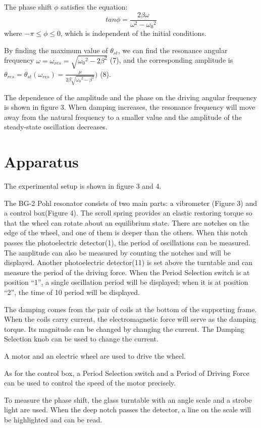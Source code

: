 \documentclass[12pt,a4paper]{article}
\begin{document}
The phase shift $\phi$ satisfies the equation:
\begin{equation}
    tan\phi=\frac{2\beta\omega}{\omega^2-{\omega_0}^2}
\end{equation}
where $-\pi\leq\phi\leq 0$, which is independent of the initial conditions. \par 
By finding the maximum value of $\theta_{st}$, we can find the resonance angular frequency $\omega=\omega_{res}=\sqrt{{\omega_0}^2-2\beta^2}$ (7), and the corresponding amplitude is $\theta_{res}=\theta_{st}(\omega_{res})=\frac{\mu}{2\beta\sqrt{{\omega_0}^2-\beta^2}})$ (8). \par 
The dependence of the amplitude and the phase on the driving angular frequency is shown in figure 3. When damping increases, the resonance frequency will move away from the natural frequency to a smaller value and the amplitude of the steady-state oscillation decreases.


\section{Apparatus}
The experimental setup is shown in figure 3 and 4.

The BG-2 Pohl resonator consists of two main parts: a vibrometer (Figure 3) and a control box(Figure 4). The scroll spring provides an elastic restoring torque so that the wheel can rotate about an equilibrium state.
There are notches on the edge of the wheel, and one of them is deeper than the others. When this notch passes the photoelectric detector(1), the period of oscillations can be measured. The amplitude can also be measured by counting the notches and will be displayed. Another photoelectric detector(11) is set above the turntable and can measure the period of the driving force. When the Period Selection switch is at position “1”, a single oscillation period will be displayed; when it is at position “2”, the time of 10 period will be displayed. \par 
The damping comes from the pair of coils at the bottom of the supporting frame. When the coils carry current, the electromagnetic force will serve as the damping torque. Its magnitude can be changed by changing the current. The Damping Selection knob can be used to change the current. \par 
A motor and an electric wheel are used to drive the wheel.\par 
As for the control box, a Period Selection switch and a Period of Driving Force can be used to control the speed of the motor precisely.\par 
To measure the phase shift, the glass turntable with an angle scale and a strobe light are used. When the deep notch passes the detector, a line on the scale will be highlighted and can be read.\par 
\end{document}
